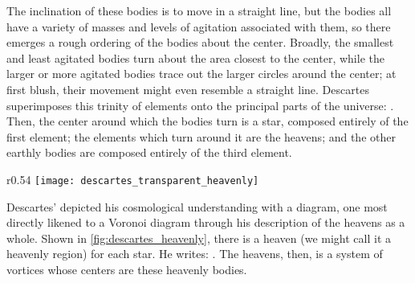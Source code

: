 \documentclass[12pt,twoside]{reedthesis}
\begin{document}
    The inclination of these  bodies is to move in a straight line, but the bodies all have a variety of masses and levels of agitation associated with them, so there emerges a rough ordering of the bodies about the center. Broadly, the smallest and least agitated bodies turn about the area closest to the center, while the larger or more agitated bodies trace out the larger circles around the center; at first blush, their movement might even resemble a straight line. Descartes superimposes this trinity of elements onto the principal parts of the universe: \citep[p.~20]{descartes}. Then, the center around which the bodies turn is a star, composed entirely of the first element; the elements which turn around it are the heavens; and the other earthly bodies are composed entirely of the third element.\par



    \begin{wrapfigure}{r}{0.54\textwidth}
      \centering
      \texttt{[image: descartes\_transparent\_heavenly]}
      \caption{Descartes' Heavenly Regions}
      \label{fig:descartes_heavenly}
    \end{wrapfigure}


   Descartes' depicted his cosmological understanding with a diagram, one most directly likened to a Voronoi diagram through his description of the heavens as a whole. Shown in \cref{fig:descartes_heavenly}, there is a heaven (we might call it a heavenly region) for each star. He writes: \citep[p. 35]{descartes}. The heavens, then, is a system of vortices whose centers are these heavenly bodies.\par
\end{document}
